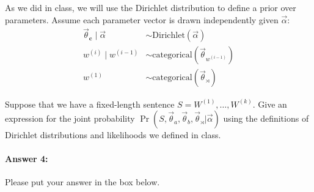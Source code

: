 \documentclass[10pt]{article}
\begin{document}
 As we did in class, we will use the Dirichlet distribution to 
define a prior over parameters.  Assume each parameter vector is drawn
independently given $\vec{\alpha}$:
\begin{align}
\vec{\theta}_{\mathbf{c}} \mid \vec{\alpha} 
    &\sim\mathrm{Dirichlet}(\vec{\alpha}) \\
w^{(i)} \mid  w^{(i-1)} 
    &\sim\mathrm{categorical}(\vec{\theta}_{w^{(i-1)}}) \\
w^{(1)} 
    &\sim \mathrm{categorical}(\vec{\theta}_{\rtimes})\
\end{align}

 Suppose that we have a fixed-length sentence
$S=W^{(1)},\dots,W^{(k)}$. Give an expression for the joint
probability
$\Pr(S, \vec{\theta}_{a}, \vec{\theta}_{b}, \vec{\theta}_{\rtimes} |
\vec{\alpha})$
using the definitions of Dirichlet distributions and likelihoods we
defined in class.

\paragraph{Answer 4:} Please put your answer in the box below.
\end{document}
